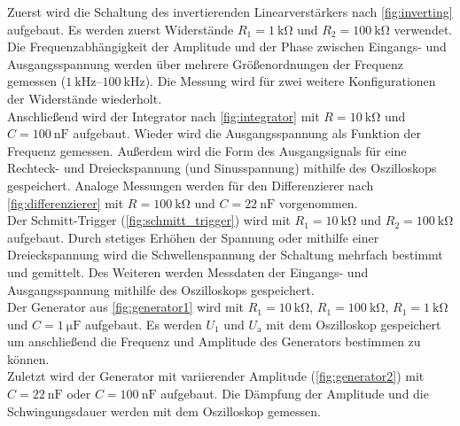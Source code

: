 Zuerst wird die Schaltung des invertierenden Linearverstärkers nach \autoref{fig:inverting} aufgebaut.
Es werden zuerst Widerstände $R_1 = \qty{1}{\kilo\ohm}$ und $R_2 = \qty{100}{\kilo\ohm}$ verwendet. Die Frequenzabhängigkeit der Amplitude und der Phase zwischen Eingangs- und 
Ausgangsspannung werden über mehrere Größenordnungen der Frequenz gemessen ($\qtyrange[range-phrase = -]{1}{100}{\kilo\hertz}$).
Die Messung wird für zwei weitere Konfigurationen der Widerstände wiederholt. \\
Anschließend wird der Integrator nach \autoref{fig:integrator} mit $R = \qty{10}{\kilo\ohm}$ und $C = \qty{100}{\nano\farad}$ aufgebaut. Wieder wird die Ausgangsspannung als
Funktion der Frequenz gemessen. Außerdem wird die Form des Ausgangsignals für eine Rechteck- und Dreieckspannung (und Sinusspannung) mithilfe des Oszilloskops gespeichert. 
Analoge Messungen werden für den Differenzierer nach \autoref{fig:differenzierer} mit $R = \qty{100}{\kilo\ohm}$ und $C = \qty{22}{\nano\farad}$ vorgenommen. \\
Der Schmitt-Trigger (\autoref{fig:schmitt_trigger}) wird mit $R_1 = \qty{10}{\kilo\ohm}$ und $R_2 = \qty{100}{\kilo\ohm}$ aufgebaut. Durch stetiges Erhöhen der Spannung oder 
mithilfe einer Dreieckspannung wird die Schwellenspannung der Schaltung mehrfach bestimmt und gemittelt. Des Weiteren werden Messdaten der Eingangs- und Ausgangsspannung mithilfe 
des Oszilloskops gespeichert. \\
Der Generator aus \autoref{fig:generator1} wird mit $R_1 = \qty{10}{\kilo\ohm}$, $R_1 = \qty{100}{\kilo\ohm}$, $R_1 = \qty{1}{\kilo\ohm}$ und $C = \qty{1}{\micro\farad}$
aufgebaut. Es werden $U_1$ und $U_\text{a}$ mit dem Oszilloskop gespeichert um anschließend die Frequenz und Amplitude des Generators bestimmen zu können. \\
Zuletzt wird der Generator mit variierender Amplitude (\autoref{fig:generator2}) mit  $C = \qty{22}{\nano\farad}$ oder $C = \qty{100}{\nano\farad}$ aufgebaut.
Die Dämpfung der Amplitude und die Schwingungsdauer werden mit dem Oszilloskop gemessen.
